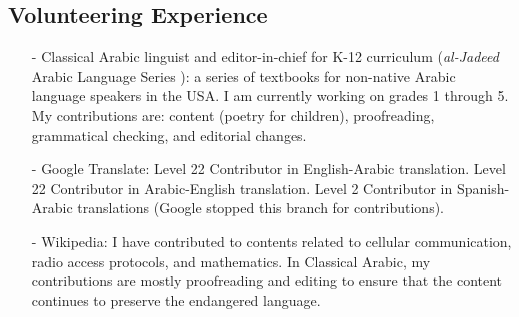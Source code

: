 \documentclass{article}
\begin{document}
\subsection*{\sc Volunteering Experience}
\begin{itemize}[leftmargin=*]
\item[-] Classical Arabic linguist and editor-in-chief for K-12 curriculum (\textit{al-Jadeed} Arabic Language Series  \foreignlanguage{arabic}{}): a series of textbooks for non-native Arabic language speakers in the USA.  I am currently working on grades 1 through 5.  My contributions are: content (poetry for children), proofreading, grammatical checking, and editorial changes.
\item[-]Google Translate: Level 22 Contributor in English-Arabic translation.  Level 22 Contributor in Arabic-English translation.  Level 2 Contributor in Spanish-Arabic translations (Google stopped this branch for contributions).
\item[-] Wikipedia: I have contributed to contents related to cellular communication, radio access protocols, and mathematics. In Classical Arabic, my contributions are mostly proofreading and editing to ensure that the content continues to preserve the endangered language.
\end{itemize}
\end{document}

